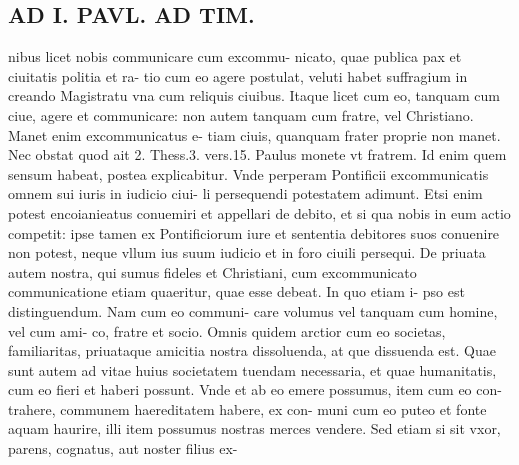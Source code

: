 \documentclass{article}
\begin{document}
\begin{pages}
\section*{AD I. PAVL. AD TIM. }
\marginpar{[ p.404 ]}\pstart nibus licet nobis communicare cum excommu- nicato, quae publica pax et ciuitatis politia et ra- tio cum eo agere postulat, veluti habet suffragium in creando Magistratu vna cum reliquis ciuibus. Itaque licet cum eo, tanquam cum ciue, agere et communicare: non autem tanquam cum fratre, vel Christiano. Manet enim excommunicatus e- tiam ciuis, quanquam frater proprie non manet. Nec obstat quod ait 2. Thess.3. vers.15. Paulus monete vt fratrem. Id enim quem sensum habeat, postea explicabitur. Vnde perperam Pontificii excommunicatis omnem sui iuris in iudicio ciui- li persequendi potestatem adimunt. Etsi enim potest encoianieatus conuemiri et appellari de debito, et si qua nobis in eum actio competit: ipse tamen ex Pontificiorum iure et sententia debitores suos conuenire non potest, neque vllum ius suum iudicio et in foro ciuili persequi.  \pend\pstart De priuata autem nostra, qui sumus fideles et Christiani, cum excommunicato communicatione etiam quaeritur, quae esse debeat. In quo etiam i- pso est distinguendum. Nam cum eo communi- care volumus vel tanquam cum homine, vel cum ami- co, fratre et socio. Omnis quidem arctior cum eo societas, familiaritas, priuataque amicitia nostra dissoluenda, at que dissuenda est. Quae sunt autem ad vitae huius societatem tuendam necessaria, et quae humanitatis, cum eo fieri et haberi possunt. Vnde et ab eo emere possumus, item cum eo con- trahere, communem haereditatem habere, ex con- muni cum eo puteo et fonte aquam haurire, illi item possumus nostras merces vendere. Sed etiam si sit vxor, parens, cognatus, aut noster filius ex-  \pend

\end{pages}
\end{document}

